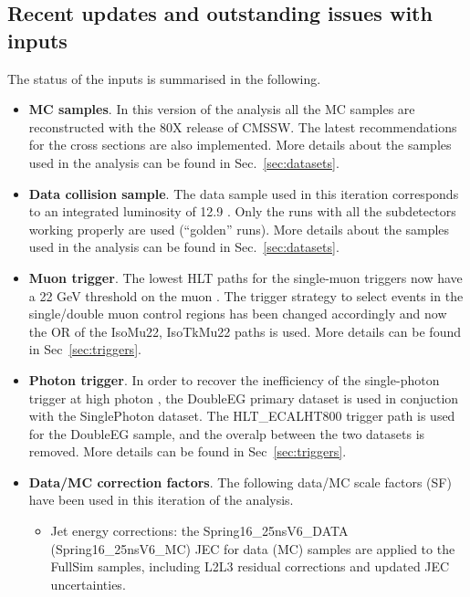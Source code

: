 \subsection{Recent updates and outstanding issues with inputs\label{sec:disclaimers}}
The status of the inputs is summarised in the following.\\
\begin{itemize}
\item \textbf{MC samples}. In this version of the analysis all the MC samples are reconstructed with the 80X 
  release of CMSSW. The latest recommendations for the cross sections are also implemented. 
  More details about the samples used in the analysis can be found in Sec.~\ref{sec:datasets}.
\item \textbf{Data collision sample}. The data sample used in this iteration corresponds to an integrated luminosity of 12.9 \ifb. 
  Only the runs with all the subdetectors working properly are used (``golden'' runs).
  More details about the samples used in the analysis can be found in Sec.~\ref{sec:datasets}. 
\item \textbf{Muon trigger}. The lowest HLT paths for the single-muon triggers now have a 22 GeV threshold on the muon \Pt. 
  The trigger strategy to select events in the single/double muon control regions has been changed accordingly and now the OR of the IsoMu22, IsoTkMu22 paths is used. 
  More details can be found in Sec~\ref{sec:triggers}.
\item \textbf{Photon trigger}. In order to recover the inefficiency of the single-photon trigger at high photon \Pt, 
  the DoubleEG primary dataset is used in conjuction with the SinglePhoton dataset. The HLT\_ECALHT800 trigger path is used for the DoubleEG sample, 
  and the overalp between the two datasets is removed. More details can be found in Sec~\ref{sec:triggers}. 
\item \textbf{Data/MC correction factors}. The following data/MC scale factors (SF) have been used in this iteration of the analysis. 
  \begin{itemize}
  \item Jet energy corrections: the Spring16\_25nsV6\_DATA (Spring16\_25nsV6\_MC) JEC for data (MC) samples are applied to the FullSim samples, 
    including L2L3 residual corrections and updated JEC uncertainties. 

\end{itemize}
\end{itemize}
